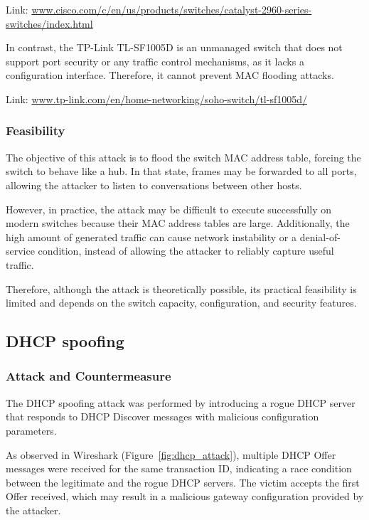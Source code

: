 \documentclass[12pt]{article}
\begin{document}
Link: \url{www.cisco.com/c/en/us/products/switches/catalyst-2960-series-switches/index.html}

\vspace{0.3cm}

In contrast, the TP-Link TL-SF1005D is an unmanaged switch that does not support port security or any traffic control mechanisms, as it lacks a configuration interface. Therefore, it cannot prevent MAC flooding attacks.

Link: \url{www.tp-link.com/en/home-networking/soho-switch/tl-sf1005d/}

\subsubsection{Feasibility}  
The objective of this attack is to flood the switch MAC address table, forcing the switch to behave like a hub. In that state, frames may be forwarded to all ports, allowing the attacker to listen to conversations between other hosts.

However, in practice, the attack may be difficult to execute successfully on modern switches because their MAC address tables are large. Additionally, the high amount of generated traffic can cause network instability or a denial-of-service condition, instead of allowing the attacker to reliably capture useful traffic.

Therefore, although the attack is theoretically possible, its practical feasibility is limited and depends on the switch capacity, configuration, and security features.

\subsection{DHCP spoofing}

\subsubsection{Attack and Countermeasure}  
The DHCP spoofing attack was performed by introducing a rogue DHCP server that responds to DHCP Discover messages with malicious configuration parameters.

As observed in Wireshark (Figure~\ref{fig:dhcp_attack}), multiple DHCP Offer messages were received for the same transaction ID, indicating a race condition between the legitimate and the rogue DHCP servers. The victim accepts the first Offer received, which may result in a malicious gateway configuration provided by the attacker.
\end{document}
